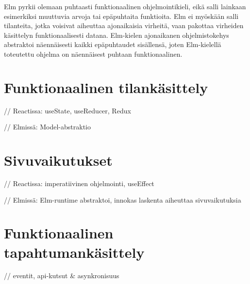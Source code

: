 Elm pyrkii olemaan puhtaasti funktionaalinen ohjelmointikieli, eikä salli lainkaan esimerkiksi muuttuvia arvoja tai
epäpuhtaita funktioita. Elm ei myöskään salli tilanteita, jotka voisivat aiheuttaa ajonaikaisia virheitä, vaan pakottaa
virheiden käsittelyn funktionaalisesti datana. Elm-kielen ajonaikanen ohjelmistokehys abstraktoi näennäisesti kaikki
epäpuhtaudet sisällensä, joten Elm-kielellä toteutettu ohjelma on näennäisest puhtaan funktionaalinen. \cite{elmlang}

\section{Funktionaalinen tilankäsittely}

// Reactissa: useState, useReducer, Redux

// Elmissä: Model-abstraktio

\section{Sivuvaikutukset}

// Reactissa: imperatiivinen ohjelmointi, useEffect

// Elmissä: Elm-runtime abstraktoi, innokas laskenta aiheuttaa sivuvaikutuksia

\section{Funktionaalinen tapahtumankäsittely}

// eventit, api-kutsut \& asynkronisuus
